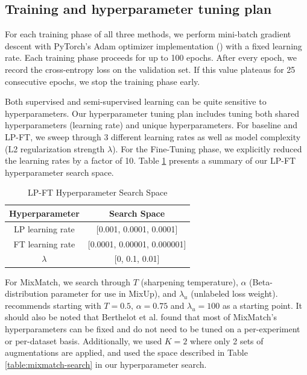 \documentclass{article}
\begin{document}
\subsection{Training and hyperparameter tuning plan}

For each training phase of all three methods, we perform mini-batch gradient descent with PyTorch's Adam optimizer implementation (\cite{paszke2019pytorch}) with a fixed learning rate. Each training phase proceeds for up to 100 epochs. After every epoch, we record the cross-entropy loss on the validation set. If this value plateaus for 25 consecutive epochs, we stop the training phase early.

Both supervised and semi-supervised learning can be quite sensitive to hyperparameters.
Our hyperparameter tuning plan includes tuning both shared hyperparameters (learning rate) and unique hyperparameters.
For baseline and LP-FT, we sweep through 3 different learning rates as well as model complexity (L2 regularization strength $\lambda$). For the Fine-Tuning phase, we explicitly reduced the learning rates by a factor of 10. Table \ref{table:lpft-search} presents a summary of our LP-FT hyperparameter search space.

\begin{table}[!ht]
    \centering
    \begin{tabular}{|c|c|}
    \hline
    \textbf{Hyperparameter} & \textbf{Search Space} \\ \hline
    LP learning rate & [0.001, 0.0001, 0.0001] \\ \hline
    FT learning rate & [0.0001, 0.00001, 0.000001] \\ \hline
    $\lambda$ & [0, 0.1, 0.01] \\ \hline
    \end{tabular}
    \caption{LP-FT Hyperparameter Search Space}
    \label{table:lpft-search}
\end{table}

For MixMatch, we search through $T$ (sharpening temperature), $\alpha$ (Beta-distribution parameter for use in MixUp), and $\lambda_u$ (unlabeled loss weight).
\cite{berthelot2019mixmatch} recommends starting with $T = 0.5$, $\alpha = 0.75$ and $\lambda_u = 100$ as a starting point. It should also be noted that Berthelot et al. found that most of MixMatch’s hyperparameters can be fixed and do not need to be tuned on a per-experiment or per-dataset basis. Additionally, we used $K = 2$ where only 2 sets of augmentations are applied, and used the space described in Table \ref{table:mixmatch-search} in our hyperparameter search.
\end{document}

